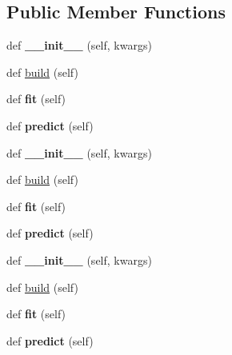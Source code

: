 \subsection*{Public Member Functions}
\begin{DoxyCompactItemize}
\item 
\mbox{\label{classgae_1_1model_1_1Model_a25a8f79629236a53d2cb535c2ac443fb}} 
def {\bfseries \+\_\+\+\_\+init\+\_\+\+\_\+} (self, kwargs)
\item 
def \mbox{\hyperlink{classgae_1_1model_1_1Model_a04510784ad07bd7f15e3798f2730700a}{build}} (self)
\item 
\mbox{\label{classgae_1_1model_1_1Model_a15161ebe091cfd4130566a0cd0179db5}} 
def {\bfseries fit} (self)
\item 
\mbox{\label{classgae_1_1model_1_1Model_a2e3aa821b39038c04c0c5b0140d7737d}} 
def {\bfseries predict} (self)
\item 
\mbox{\label{classgae_1_1model_1_1Model_a25a8f79629236a53d2cb535c2ac443fb}} 
def {\bfseries \+\_\+\+\_\+init\+\_\+\+\_\+} (self, kwargs)
\item 
def \mbox{\hyperlink{classgae_1_1model_1_1Model_a04510784ad07bd7f15e3798f2730700a}{build}} (self)
\item 
\mbox{\label{classgae_1_1model_1_1Model_a15161ebe091cfd4130566a0cd0179db5}} 
def {\bfseries fit} (self)
\item 
\mbox{\label{classgae_1_1model_1_1Model_a2e3aa821b39038c04c0c5b0140d7737d}} 
def {\bfseries predict} (self)
\item 
\mbox{\label{classgae_1_1model_1_1Model_a25a8f79629236a53d2cb535c2ac443fb}} 
def {\bfseries \+\_\+\+\_\+init\+\_\+\+\_\+} (self, kwargs)
\item 
def \mbox{\hyperlink{classgae_1_1model_1_1Model_a04510784ad07bd7f15e3798f2730700a}{build}} (self)
\item 
\mbox{\label{classgae_1_1model_1_1Model_a15161ebe091cfd4130566a0cd0179db5}} 
def {\bfseries fit} (self)
\item 
\mbox{\label{classgae_1_1model_1_1Model_a2e3aa821b39038c04c0c5b0140d7737d}} 
def {\bfseries predict} (self)
\end{DoxyCompactItemize}
